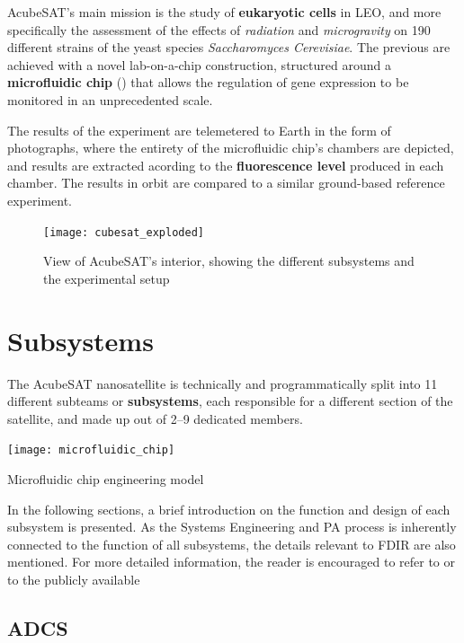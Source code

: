 \documentclass[a4paper,nobib]{tufte-book}
\begin{document}
AcubeSAT's main mission is the study of \textbf{eukaryotic cells} in \acl{LEO}, and more specifically the assessment of the effects of \emph{radiation} and \emph{microgravity} on 190 different strains of the yeast species \emph{Saccharomyces Cerevisiae}. The previous are achieved with a novel lab-on-a-chip construction, structured around a \textbf{microfluidic chip} () \autocite{volpetti_microfluidic_biodisplay_2017} that allows the regulation of gene expression to be monitored in an unprecedented scale.

The results of the experiment are telemetered to Earth in the form of photographs, where the entirety of the microfluidic chip's chambers are depicted, and results are extracted acording to the \textbf{fluorescence level} produced in each chamber. The results in orbit are compared to a similar ground-based reference experiment.

\begin{figure}[t]
	\centering
	\texttt{[image: cubesat\_exploded]}
	\caption{View of AcubeSAT's interior, showing the different subsystems and the experimental setup}
\end{figure}

\section{Subsystems}

The AcubeSAT nanosatellite is technically and programmatically split into 11 different subteams or \textbf{subsystems}, each responsible for a different section of the satellite, and made up out of \SIrange{2}{9}{} dedicated members.

\begin{marginfigure}
	\texttt{[image: microfluidic\_chip]}
	\caption{Microfluidic chip engineering model}
	\label{fig:microfluidic_chip}
\end{marginfigure}

In the following sections, a brief introduction on the function and design of each subsystem is presented. As the Systems Engineering and \acl{PA} process is inherently connected to the function of all subsystems, the details relevant to \acs{FDIR} are also mentioned. For more detailed information, the reader is encouraged to refer to  or to the publicly available 
\subsection{\acf{ADCS}}
\label{sec:adcs}
\end{document}
